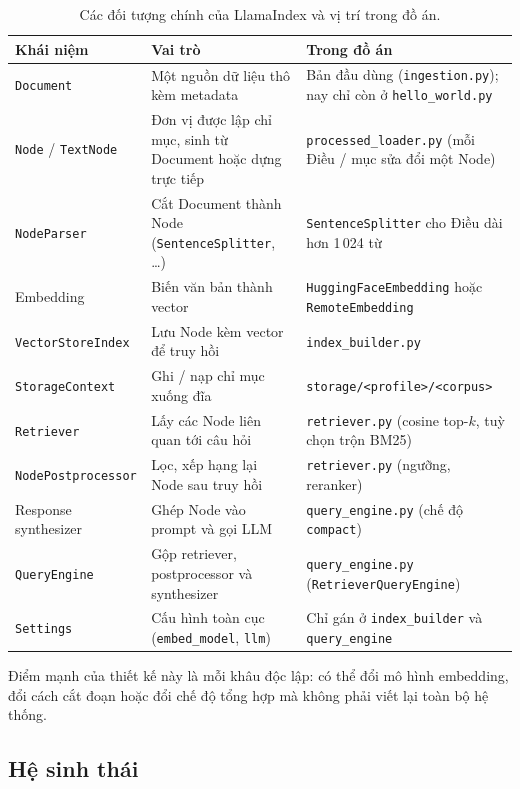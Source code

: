 \begin{table}[H]
  \centering
  \small
  \begin{tabularx}{\textwidth}{l X X}
    \toprule
    \textbf{Khái niệm} & \textbf{Vai trò} & \textbf{Trong đồ án} \\
    \midrule
    \texttt{Document} & Một nguồn dữ liệu thô kèm metadata & Bản đầu dùng (\texttt{ingestion.py}); nay chỉ còn ở \texttt{hello\_world.py} \\
    \texttt{Node} / \texttt{TextNode} & Đơn vị được lập chỉ mục, sinh từ Document hoặc dựng trực tiếp & \texttt{processed\_loader.py} (mỗi Điều / mục sửa đổi một Node) \\
    \texttt{NodeParser} & Cắt Document thành Node (\texttt{SentenceSplitter}, \ldots) & \texttt{SentenceSplitter} cho Điều dài hơn 1\,024 từ \\
    Embedding & Biến văn bản thành vector & \texttt{HuggingFaceEmbedding} hoặc \texttt{RemoteEmbedding} \\
    \texttt{VectorStoreIndex} & Lưu Node kèm vector để truy hồi & \texttt{index\_builder.py} \\
    \texttt{StorageContext} & Ghi / nạp chỉ mục xuống đĩa & \texttt{storage/<profile>/<corpus>} \\
    \texttt{Retriever} & Lấy các Node liên quan tới câu hỏi & \texttt{retriever.py} (cosine top-$k$, tuỳ chọn trộn BM25) \\
    \texttt{NodePostprocessor} & Lọc, xếp hạng lại Node sau truy hồi & \texttt{retriever.py} (ngưỡng, reranker) \\
    Response synthesizer & Ghép Node vào prompt và gọi LLM & \texttt{query\_engine.py} (chế độ \texttt{compact}) \\
    \texttt{QueryEngine} & Gộp retriever, postprocessor và synthesizer & \texttt{query\_engine.py} (\texttt{RetrieverQueryEngine}) \\
    \texttt{Settings} & Cấu hình toàn cục (\texttt{embed\_model}, \texttt{llm}) & Chỉ gán ở \texttt{index\_builder} và \texttt{query\_engine} \\
    \bottomrule
  \end{tabularx}
  \caption{Các đối tượng chính của LlamaIndex và vị trí trong đồ án.}
  \label{tab:khai-niem}
\end{table}

Điểm mạnh của thiết kế này là mỗi khâu độc lập: có thể đổi mô hình embedding, đổi cách cắt đoạn hoặc
đổi chế độ tổng hợp mà không phải viết lại toàn bộ hệ thống.

\subsection{Hệ sinh thái}

